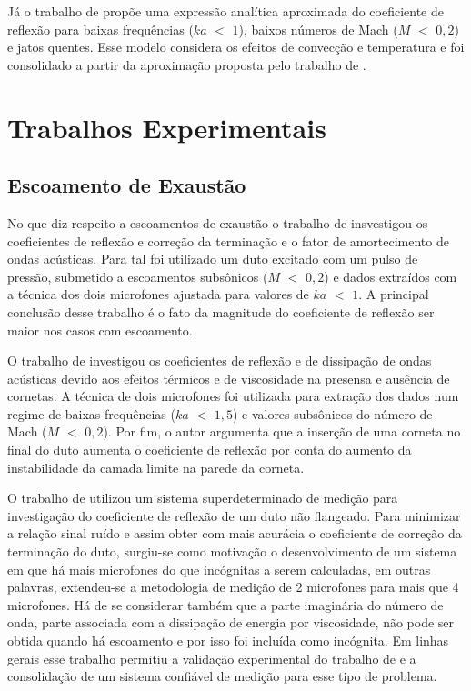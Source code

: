 Já o trabalho de  propõe uma expressão analítica aproximada do coeficiente de reflexão para baixas frequências ($ka$ $<$ $1$), baixos números de Mach ($M$ $<$ $0,2$) e jatos quentes. Esse modelo considera os efeitos de convecção e temperatura e foi consolidado a partir da aproximação proposta pelo trabalho de .   

\section{Trabalhos Experimentais}

\subsection{Escoamento de Exaustão}

No que diz respeito a escoamentos de exaustão o trabalho de  insvestigou os coeficientes de reflexão e correção da terminação e o fator de amortecimento de ondas acústicas. Para tal foi utilizado um duto excitado com um pulso de pressão, submetido a escoamentos subsônicos ($M$ $<$ $0,2$) e dados extraídos com a técnica dos dois microfones ajustada para valores de $ka$ $<$ $1$. A principal conclusão desse trabalho é o fato da magnitude do coeficiente de reflexão ser maior nos casos com escoamento.

O trabalho de  investigou os coeficientes de reflexão e de dissipação de ondas acústicas devido aos efeitos térmicos e de viscosidade na presensa e ausência de cornetas. A técnica de dois microfones foi utilizada para extração dos dados num regime de baixas frequências ($ka$ $<$ $1,5$) e valores subsônicos do número de Mach ($M$ $<$ $0,2$). Por fim, o autor argumenta que a inserção de uma corneta no final do duto aumenta o coeficiente de reflexão por conta do aumento da instabilidade da camada limite na parede da corneta.

O trabalho de  utilizou um sistema superdeterminado de medição para investigação do coeficiente de reflexão de um duto não flangeado. Para minimizar a relação sinal ruído e assim obter com mais acurácia o coeficiente de correção da terminação do duto, surgiu-se como motivação o desenvolvimento de um sistema em que há mais microfones do que incógnitas a serem calculadas, em outras palavras, extendeu-se a metodologia de medição de 2 microfones para mais que 4 microfones. Há de se considerar também que a parte imaginária do número de onda, parte associada com a dissipação de energia por viscosidade, não pode ser obtida quando há escoamento e por isso foi incluída como incógnita. Em linhas gerais esse trabalho permitiu a validação experimental do trabalho de  e a consolidação de um sistema confiável de medição para esse tipo de problema.

